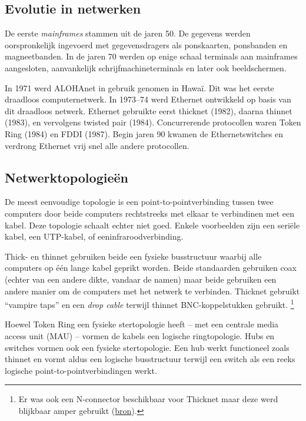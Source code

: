 \subsection{Evolutie in netwerken}

De eerste \emph{mainframes} stammen uit de jaren 50.
De gegevens werden oorspronkelijk ingevoerd met gegevensdragers als ponskaarten, ponsbanden en magneetbanden.
In de jaren 70 werden op enige schaal terminals aan mainframes aangesloten, aanvankelijk schrijfmachineterminals en later ook beeldschermen.

In 1971 werd ALOHAnet in gebruik genomen in Hawaï.
Dit was het eerste draadloos computernetwerk.
In 1973--74 werd Ethernet ontwikkeld op basis van dit draadloos netwerk.
Ethernet gebruikte eerst thicknet (1982), daarna thinnet (1983), en vervolgens twisted pair (1984).
Concurrerende protocollen waren Token Ring (1984) en FDDI (1987).
Begin jaren 90 kwamen de Ethernetswitches en verdrong Ethernet vrij snel alle andere protocollen.



\subsection{Netwerktopologieën}

De meest eenvoudige topologie is een point-to-pointverbinding tussen twee computers door beide computers rechtstreeks met elkaar te verbindinen met een kabel.
Deze topologie schaalt echter niet goed.
Enkele voorbeelden zijn een seriële kabel, een UTP-kabel, of eeninfraroodverbinding.

Thick- en thinnet gebruiken beide een fysieke busstructuur waarbij alle computers op één lange kabel geprikt worden.
Beide standaarden gebruiken coax (echter van een andere dikte, vandaar de namen) maar beide gebruiken een andere manier om de computers met het netwerk te verbinden.
Thicknet gebruikt ``vampire taps'' en een \emph{drop cable} terwijl thinnet BNC-koppelstukken gebruikt.%
   \footnote{Er was ook een N-connector beschikbaar voor Thicknet maar deze werd blijkbaar amper gebruikt (\href{http://www.mattmillman.com/projects/10base5/}{bron}).}

Hoewel Token Ring een fysieke stertopologie heeft -- met een centrale media access unit (MAU) -- vormen de kabels een logische ringtopologie.
Hubs en switches vormen ook een fysieke stertopologie.
Een hub werkt functioneel zoals thinnet en vormt aldus een logische busstructuur terwijl een switch als een reeks logische point-to-pointverbindingen werkt.

